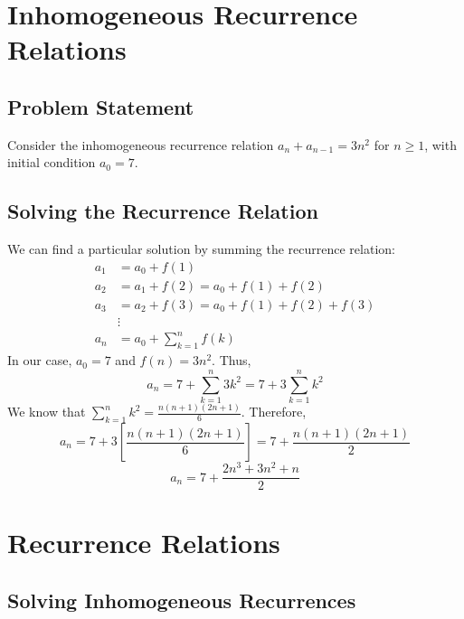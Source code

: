 \documentclass{report}
\begin{document}
\section{Inhomogeneous Recurrence Relations}

\subsection{Problem Statement}

Consider the inhomogeneous recurrence relation $a_n + a_{n-1} = 3n^2$ for $n \geq 1$, with initial condition $a_0 = 7$.

\subsection{Solving the Recurrence Relation}

We can find a particular solution by summing the recurrence relation:
\begin{align*}
	a_1 & = a_0 + f(1)                            \\
	a_2 & = a_1 + f(2) = a_0 + f(1) + f(2)        \\
	a_3 & = a_2 + f(3) = a_0 + f(1) + f(2) + f(3) \\
	    & \vdots                                  \\
	a_n & = a_0 + \sum_{k=1}^{n} f(k)
\end{align*}
In our case, $a_0 = 7$ and $f(n) = 3n^2$. Thus,
$$a_n = 7 + \sum_{k=1}^{n} 3k^2 = 7 + 3\sum_{k=1}^{n} k^2$$
We know that $\sum_{k=1}^{n} k^2 = \frac{n(n+1)(2n+1)}{6}$. Therefore,
$$a_n = 7 + 3\left[\frac{n(n+1)(2n+1)}{6}\right] = 7 + \frac{n(n+1)(2n+1)}{2}$$
$$a_n = 7 + \frac{2n^3 + 3n^2 + n}{2}$$


\section{Recurrence Relations}

\subsection{Solving Inhomogeneous Recurrences}

\end{document}
